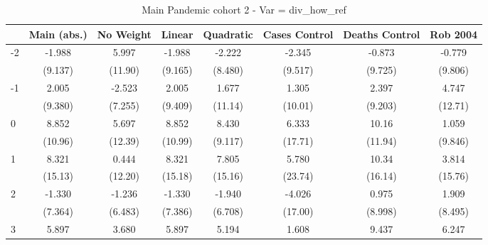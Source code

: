 \documentclass{article}
\begin{document}
{
\def\sym#1{\ifmmode^{#1}\else\(^{#1}\)\fi}
\begin{longtable}{l*{7}{c}}
\caption{Main Pandemic cohort 2 - Var = div\_how\_ref}\\
\hline\hline\endfirsthead\hline\endhead\hline\endfoot\endlastfoot
                &\multicolumn{1}{c}{Main (abs.)}&\multicolumn{1}{c}{No Weight}&\multicolumn{1}{c}{Linear}&\multicolumn{1}{c}{Quadratic}&\multicolumn{1}{c}{Cases Control}&\multicolumn{1}{c}{Deaths Control}&\multicolumn{1}{c}{Rob 2004}\\
\hline
-2              &   -1.988         &    5.997         &   -1.988         &   -2.222         &   -2.345         &   -0.873         &   -0.779         \\
                &  (9.137)         &  (11.90)         &  (9.165)         &  (8.480)         &  (9.517)         &  (9.725)         &  (9.806)         \\
-1              &    2.005         &   -2.523         &    2.005         &    1.677         &    1.305         &    2.397         &    4.747         \\
                &  (9.380)         &  (7.255)         &  (9.409)         &  (11.14)         &  (10.01)         &  (9.203)         &  (12.71)         \\
0               &    8.852         &    5.697         &    8.852         &    8.430         &    6.333         &    10.16         &    1.059         \\
                &  (10.96)         &  (12.39)         &  (10.99)         &  (9.117)         &  (17.71)         &  (11.94)         &  (9.846)         \\
1               &    8.321         &    0.444         &    8.321         &    7.805         &    5.780         &    10.34         &    3.814         \\
                &  (15.13)         &  (12.20)         &  (15.18)         &  (15.16)         &  (23.74)         &  (16.14)         &  (15.76)         \\
2               &   -1.330         &   -1.236         &   -1.330         &   -1.940         &   -4.026         &    0.975         &    1.909         \\
                &  (7.364)         &  (6.483)         &  (7.386)         &  (6.708)         &  (17.00)         &  (8.998)         &  (8.495)         \\
3               &    5.897         &    3.680         &    5.897         &    5.194         &    1.608         &    9.437         &    6.247         \\

\end{longtable}}
\end{document}
